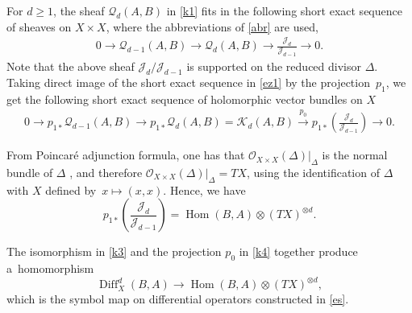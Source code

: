 \documentclass[pdftex]{sigma}
\numberwithin{equation}{section}
\begin{document}
For $d \geq 1$, the sheaf ${\mathcal Q}_d(A, B)$ in \eqref{k1} fits in the following short
exact sequence of sheaves on $X\times X$, where the abbreviations of \eqref{abr} are used,
\begin{gather}\label{ez1}
0 \longrightarrow {\mathcal Q}_{d-1}(A, B) \longrightarrow {\mathcal Q}_{d}(A, B) \longrightarrow
 \frac{\mathcal{J}_d}{\mathcal{J}_{d-1}} \longrightarrow 0.
\end{gather}
Note that the above sheaf $\mathcal{J}_d/\mathcal{J}_{d-1}$ is supported on the reduced divisor ${\Delta}$.
Taking direct image of the short exact sequence in \eqref{ez1} by the projection~$p_1$, we get the following
short exact sequence of holomorphic vector bundles on $X$
\begin{gather}
0 \longrightarrow p_{1*} {\mathcal Q}_{d-1}(A, B) \longrightarrow p_{1*} {\mathcal Q}_d(A, B)
 = {\mathcal K}_d(A, B)
\stackrel{p_0}{\longrightarrow} p_{1*} \left( \frac{\mathcal{J}_d}{\mathcal{J}_{d-1}}\right) \longrightarrow 0.\label{k4}
\end{gather}

From Poincar\'e adjunction formula, one has that ${\mathcal O}_{X\times X}({\Delta})\big\vert_{\Delta}$
is the normal bundle of ${\Delta}$ \cite[p.~146]{GH}, and therefore ${\mathcal O}_{X\times X}({\Delta})\big\vert_{\Delta} = TX$, using the identification of
${\Delta}$ with $X$ defined by~$x \longmapsto (x, x)$. Hence, we have
\[
p_{1*}\left( \frac{\mathcal{J}_d}{\mathcal{J}_{d-1}}\right) = \operatorname{Hom}(B, A)\otimes (TX)^{\otimes d}.
\]

\begin{Remark} The isomorphism in \eqref{k3} and the projection $p_0$ in \eqref{k4} together produce a~homomorphism
\begin{equation}\label{k5}
\operatorname{Diff}^d_X(B, A) \longrightarrow \operatorname{Hom}(B, A)\otimes (TX)^{\otimes d},
\end{equation}
which is the symbol map on differential operators constructed in \eqref{es}.\end{Remark}
\end{document}
